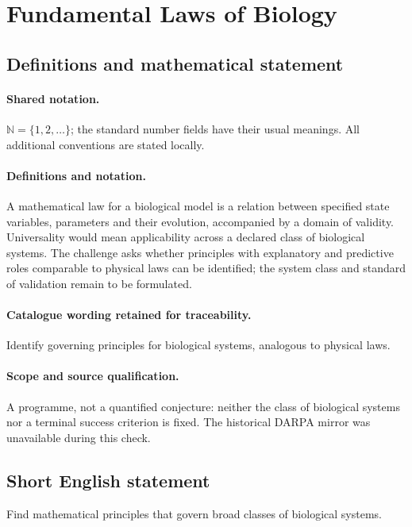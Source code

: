 \documentclass[11pt]{article}
\begin{document}
\section{Fundamental Laws of Biology}\label{statement}

\subsection{Definitions and mathematical statement}

\paragraph{Shared notation.}$\mathbb N=\{1,2,\ldots\}$; the standard number fields have their usual meanings. All additional conventions are stated locally.


\paragraph{Definitions and notation.}A mathematical law for a biological model is a relation between specified state variables, parameters and their evolution, accompanied by a domain of validity. Universality would mean applicability across a declared class of biological systems. The challenge asks whether principles with explanatory and predictive roles comparable to physical laws can be identified; the system class and standard of validation remain to be formulated.

\paragraph{Catalogue wording retained for traceability.}
Identify governing principles for biological systems, analogous to physical laws.
\paragraph{Scope and source qualification.}A programme, not a quantified conjecture: neither the class of biological systems nor a terminal success criterion is fixed. The historical DARPA mirror was unavailable during this check.
\subsection{Short English statement}
Find mathematical principles that govern broad classes of biological systems.
\end{document}
